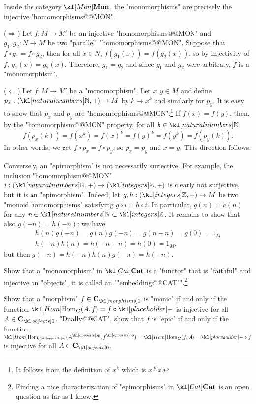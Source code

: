 \documentclass[main.tex]{subfiles}
\begin{document}
\begin{exmp}[$\catMon$]\label{exmp:monepiMON}
Inside the category $\catMon$, the "monomorphisms" are precisely the injective "homomorphisms@@MON".

($\Rightarrow$) Let $f:M\rightarrow M'$ be an injective "homomorphisms@@MON" and $g_1,g_2:N\rightarrow M$ be two "parallel" "homomorphisms@@MON". Suppose that $f\circ g_1 = f\circ g_2$, then for all $x \in N$, $f(g_1(x)) = f(g_2(x))$, so by injectivity of $f$, $g_1(x) = g_2(x)$. Therefore, $g_1 = g_2$ and since $g_1$ and $g_2$ were arbitrary, $f$ is a "monomorphism".

($\Leftarrow$) Let $f:M\rightarrow M'$ be a "monomorphism". Let $x,y \in M$ and define $p_x :(\N,+) \rightarrow M$ by $k\mapsto x^k$ and similarly for $p_y$. It is easy to show that $p_x$ and $p_y$ are "homomorphisms@@MON".\footnote{It follows from the definition of $x^k$ which is $x\stackrel{k}{\cdots}x$.} If $f(x) = f(y)$, then, by the "homomorphism@@MON" property, for all $k \in \N$
\[f(p_x(k))= f(x^k) = f(x)^k  = f(y)^k = f(y^k) = f(p_y(k)).\]
In other words, we get $f\circ p_x = f \circ p_y$, so $p_x = p_y$ and $x = y$. This direction follows.

Conversely, an "epimorphism" is not necessarily surjective. For example, the inclusion "homomorphism@@MON" $i:(\N,+) \rightarrow (\Z,+)$ is clearly not surjective, but it is an "epimorphism". Indeed, let $g,h: (\Z,+)\rightarrow M$ be two "monoid homomorphisms" satisfying $g \circ i = h\circ i$. In particular, $g(n) = h(n)$ for any $n \in \N\subset \Z$. It remains to show that also $g(-n) = h(-n)$: we have
\begin{gather*}
	h(n)g(-n) = g(n)g(-n) = g(n-n) = g(0) = 1_M\\
	h(-n)h(n) = h(-n+n) = h(0) = 1_M,
\end{gather*} but then $g(-n) = h(-n)h(n)g(-n) = h(-n)$.
\end{exmp}
\begin{exer}\label{exer:duality:monicCat}
	Show that a "monomorphism" in $\catCat$ is a "functor" that is "faithful" and injective on "objects", it is called an ""embedding@@CAT"".\footnote{Finding a nice characterization of "epimorphisms" in $\catCat$ is an open question as far as I know.} %
\end{exer}
\begin{exer}\label{exer:duality:altdefmonepi}
	Show that a "morphism" $f\in \mor{\mathbf{C}}$ is "monic" if and only if the function $\Hom_{\mathbf{C}}(A,f) = f \circ \placeholder$ is injective for all $A \in \obj{\mathbf{C}}$. "Dually@@CAT", show that $f$ is "epic" if and only if the function $\Hom_{\op{\mathbf{C}}}(\op{A},\op{f}) = \Hom_{\mathbf{C}}(f,A) = \placeholder \circ f$ is injective for all $A \in \obj{\mathbf{C}}$.
\end{exer}
\end{document}
